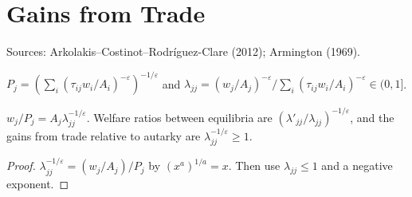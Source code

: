 \chapter{Gains from Trade}
\label{chap:trade}

Sources: Arkolakis--Costinot--Rodr\'iguez-Clare (2012); Armington (1969).

\begin{definition}
\label{def:acr_world}
\leanok
$P_j = (\sum_i(\tau_{ij}w_i/A_i)^{-\varepsilon})^{-1/\varepsilon}$ and $\lambda_{jj} = (w_j/A_j)^{-\varepsilon}/\sum_i(\tau_{ij}w_i/A_i)^{-\varepsilon}
\in (0,1]$.
\end{definition}

\begin{theorem}[ACR]
\label{thm:acr}
\leanok
{}
$w_j/P_j = A_j\lambda_{jj}^{-1/\varepsilon}$. Welfare ratios between equilibria are $(\lambda'_{jj}/\lambda_{jj})^{-1/\varepsilon}$, and
the gains from trade relative to autarky are $\lambda_{jj}^{-1/\varepsilon} \ge 1$.
\end{theorem}
\begin{proof}
\leanok
$\lambda_{jj}^{-1/\varepsilon} = (w_j/A_j)/P_j$ by $(x^a)^{1/a} = x$. Then use $\lambda_{jj} \le 1$ and a negative exponent.
\end{proof}
